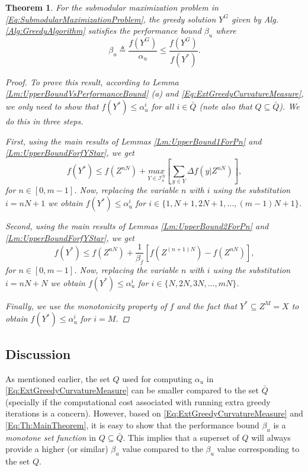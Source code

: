 \documentclass[conference]{IEEEtran}
\newtheorem{theorem}{Theorem}
\begin{document}
\begin{theorem}\label{Th:MainTheorem}
For the submodular maximization problem in \eqref{Eq:SubmodularMaximizationProblem}, the greedy solution $Y^G$ given by Alg. \ref{Alg:GreedyAlgorithm} satisfies the performance bound $\beta_u$ where 
\begin{equation}\label{Eq:Th:MainTheorem}
\beta_u \triangleq \frac{f(Y^G)}{\alpha_u} \leq \frac{f(Y^G)}{f(Y^*)}. 
\end{equation}
\begin{proof}
To prove this result, according to Lemma \ref{Lm:UpperBoundVsPerformanceBound} (a) and \eqref{Eq:ExtGreedyCurvatureMeasure}, we only need to show that $f(Y^*) \leq \alpha_u^i$ for all $i \in \bar{Q}$ (note also that $Q\subseteq \bar{Q}$). We do this in three steps.

First, using the main results of Lemmas \ref{Lm:UpperBound1ForPn} and \ref{Lm:UpperBoundForfYStar}, we get
\begin{equation}
    f(Y^*) \leq f(Z^{nN}) +  \underset{Y\in\mathcal{I}^N_n}{max} \left[ \sum_{y\in Y} \Delta f(y\vert Z^{nN}) \right],
\end{equation}
for $n\in[0,m-1]$. Now, replacing the variable $n$ with $i$ using the substitution $i=nN+1$ we obtain $f(Y^*) \leq \alpha^i_u$ for $i\in\{1,N+1,2N+1,\ldots,(m-1)N+1\}$.

Second, using the main results of Lemmas \ref{Lm:UpperBound2ForPn} and \ref{Lm:UpperBoundForfYStar}, we get
\begin{equation}
    f(Y^*) \leq f(Z^{nN}) + \frac{1}{\beta_f}\left[ f(Z^{(n+1)N})-f(Z^{nN})\right],
\end{equation}
for $n\in[0,m-1]$. Now, replacing the variable $n$ with $i$ using the substitution $i=nN+N$ we obtain $f(Y^*) \leq \alpha^i_u$ for $i\in\{N,2N,3N,\ldots,mN\}$.

Finally, we use the monotonicity property of $f$ and the fact that $Y^* \subseteq Z^M=X$ to obtain $f(Y^*) \leq \alpha^i_u$ for $i=M$. 
\end{proof}
\end{theorem}





\subsection{Discussion}

As mentioned earlier, the set $Q$ used for computing $\alpha_u$ in \eqref{Eq:ExtGreedyCurvatureMeasure} can be smaller compared to the set $\bar{Q}$ (specially if the computational cost associated with running extra greedy iterations is a concern). However, based on \eqref{Eq:ExtGreedyCurvatureMeasure} and \eqref{Eq:Th:MainTheorem}, it is easy to show that the performance bound $\beta_u$ is a \emph{monotone set function} in $Q \subseteq \bar{Q}$. This implies that a superset of $Q$ will always provide a higher (or similar) $\beta_u$ value compared to the $\beta_u$ value corresponding to the set $Q$.
\end{document}
